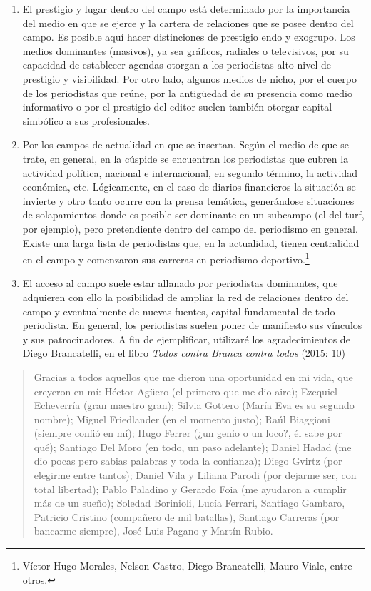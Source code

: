 {\begin{enumerate}
\def\labelenumi{\alph{enumi})}
\setcounter{enumi}{1}
\item
  El prestigio y lugar dentro del campo está determinado por la importancia del medio en que se ejerce y la cartera de relaciones que se posee dentro del campo. Es posible aquí hacer distinciones de prestigio endo y exogrupo. Los medios dominantes (masivos), ya sea gráficos, radiales o televisivos, por su capacidad de establecer agendas otorgan a los periodistas alto nivel de prestigio y visibilidad. Por otro lado, algunos medios de nicho, por el cuerpo de los periodistas que reúne, por la antigüedad de su presencia como medio informativo o por el prestigio del editor suelen también otorgar capital simbólico a sus profesionales.
\item
  Por los campos de actualidad en que se insertan. Según el medio de que se trate, en general, en la cúspide se encuentran los periodistas que cubren la actividad política, nacional e internacional, en segundo término, la actividad económica, etc. Lógicamente, en el caso de diarios financieros la situación se invierte y otro tanto ocurre con la prensa temática, generándose situaciones de solapamientos donde es posible ser dominante en un subcampo (el del turf, por ejemplo), pero pretendiente dentro del campo del periodismo en general. Existe una larga lista de periodistas que, en la actualidad, tienen centralidad en el campo y comenzaron sus carreras en periodismo deportivo.\footnote{Víctor Hugo Morales, Nelson Castro, Diego Brancatelli, Mauro Viale, entre otros.}
\item
  El acceso al campo suele estar allanado por periodistas dominantes, que adquieren con ello la posibilidad de ampliar la red de relaciones dentro del campo y eventualmente de nuevas fuentes, capital fundamental de todo periodista. En general, los periodistas suelen poner de manifiesto sus vínculos y sus patrocinadores. A fin de ejemplificar, utilizaré los agradecimientos de Diego Brancatelli, en el libro \emph{Todos contra Branca contra todos} (2015: 10)
\end{enumerate}

\begin{quote}
Gracias a todos aquellos que me dieron una oportunidad en mi vida, que creyeron en mí: Héctor Agüero (el primero que me dio aire); Ezequiel Echeverría (gran maestro gran); Silvia Gottero (María Eva es su segundo nombre); Miguel Friedlander (en el momento justo); Raúl Biaggioni (siempre confió en mí); Hugo Ferrer (¿un genio o un loco?, él sabe por qué); Santiago Del Moro (en todo, un paso adelante); Daniel Hadad (me dio pocas pero sabias palabras y toda la confianza); Diego Gvirtz (por elegirme entre tantos); Daniel Vila y Liliana Parodi (por dejarme ser, con total libertad); Pablo Paladino y Gerardo Foia (me ayudaron a cumplir más de un sueño); Soledad Borinioli, Lucía Ferrari, Santiago Gambaro, Patricio Cristino (compañero de mil batallas), Santiago Carreras (por bancarme siempre), José Luis Pagano y Martín Rubio.
\end{quote}

}
